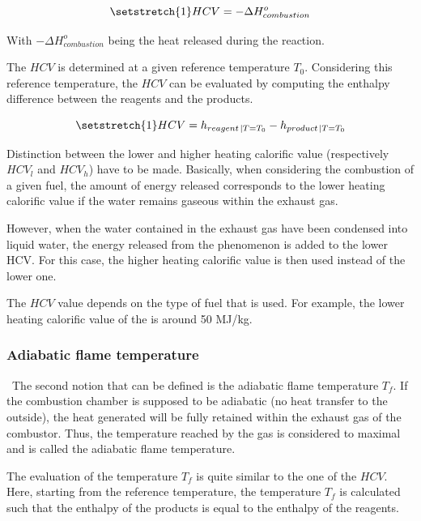 \begin{equation}
    \setstretch{1}
    HCV = -\Delta H^o_{combustion} \label{eq:C4_HCV1}
\end{equation}

With \(-\Delta H^o_{combustion}\) being the heat released during the reaction.

The \(HCV\) is determined at a given reference temperature \(T_0\). Considering this reference temperature, the \(HCV\) can be evaluated by computing the enthalpy difference between the reagents and the products.

\begin{equation}
    \setstretch{1}
    HCV = h_{reagent\left.\right|T=T_0} - h_{product\left.\right|T=T_0}\label{eq:C4_HCV2}
\end{equation}

Distinction between the lower and higher heating calorific value (respectively $HCV_l$ and $HCV_h$) have to be made. Basically, when considering the combustion of a given fuel, the amount of energy released corresponds to the lower heating calorific value if the water remains gaseous within the exhaust gas. 

However, when the water contained in the exhaust gas have been condensed into liquid water, the energy released from the phenomenon is added to the lower HCV. For this case, the higher heating calorific value is then used instead of the lower one.  

The \(HCV\) value depends on the type of fuel that is used. For example, the lower heating calorific value of the  is around 50 MJ/kg.

\subsubsection{Adiabatic flame temperature}
\quad\ The second notion that can be defined is the adiabatic flame temperature \(T_f\). If the combustion chamber is supposed to be adiabatic (no heat transfer to the outside), the heat generated will be fully retained within the exhaust gas of the combustor. Thus, the temperature reached by the gas is considered to maximal and is called the adiabatic flame temperature.

The evaluation of the temperature \(T_f\) is quite similar to the one of the \(HCV\). Here, starting from the reference temperature, the temperature \(T_f\) is calculated such that the enthalpy of the products is equal to the enthalpy of the reagents.

